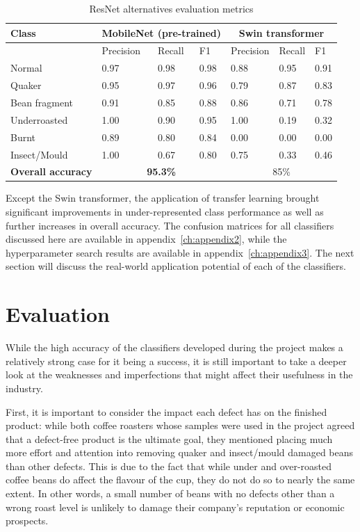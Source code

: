 \begin{table}[h]
    \centering
    \begin{tabular}{*7l}
        \toprule
        \textbf{Class} & \multicolumn{3}{c}{MobileNet (pre-trained)} & \multicolumn{3}{c}{Swin transformer} \\
        \midrule
        {}            & Precision & Recall & F1   & Precision & Recall & F1   \\
        Normal        & 0.97      & 0.98   & 0.98 & 0.88      & 0.95   & 0.91 \\
        Quaker        & 0.95      & 0.97   & 0.96 & 0.79      & 0.87   & 0.83 \\
        Bean fragment & 0.91      & 0.85   & 0.88 & 0.86      & 0.71   & 0.78 \\
        Underroasted  & 1.00      & 0.90   & 0.95 & 1.00      & 0.19   & 0.32 \\
        Burnt         & 0.89      & 0.80   & 0.84 & 0.00      & 0.00   & 0.00 \\
        Insect/Mould  & 1.00      & 0.67   & 0.80 & 0.75      & 0.33   & 0.46 \\
        \midrule
        \textbf{Overall accuracy} & \multicolumn{3}{c}{\textbf{95.3\%}} & \multicolumn{3}{c}{85\%} \\
        \bottomrule
    \end{tabular}
    \caption{ResNet alternatives evaluation metrics}
    \label{tab:transfer-results-2}
\end{table}
Except the Swin transformer, the application of transfer learning brought significant improvements in
under-represented class performance as well as further increases in overall accuracy.
The confusion matrices for all classifiers discussed here are available in appendix~\ref{ch:appendix2}, while
the hyperparameter search results are available in appendix~\ref{ch:appendix3}.
The next section will discuss the real-world application potential of each of the classifiers.

\section{Evaluation}
\label{sec:evaluation}
While the high accuracy of the classifiers developed during the project makes a relatively strong case for it being a success,
it is still important to take a deeper look at the weaknesses and imperfections that might affect their usefulness in the industry.

First, it is important to consider the impact each defect has on the finished product: while both coffee roasters whose
samples were used in the project agreed that a defect-free product is the ultimate goal, they mentioned placing much more
effort and attention into removing quaker and insect/mould damaged beans than other defects.
This is due to the fact that while under and over-roasted coffee beans do affect the flavour of the cup, they do not
do so to nearly the same extent.
In other words, a small number of beans with no defects other than a wrong roast level is unlikely to damage their company's
reputation or economic prospects.

